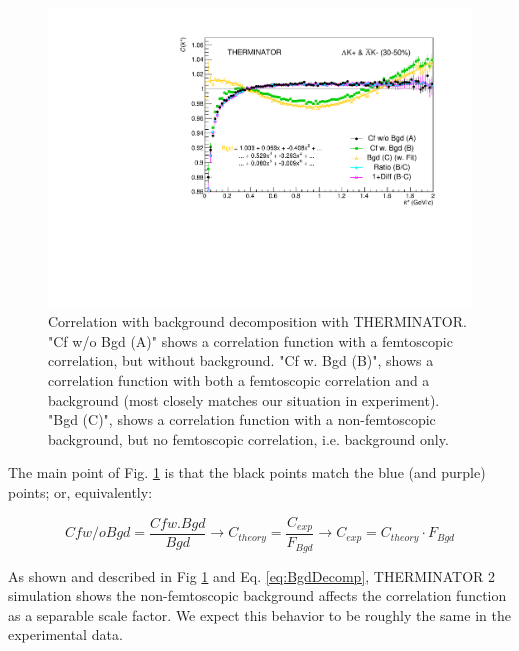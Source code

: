 \documentclass[../AnalysisNoteJBuxton.tex]{subfiles}
\begin{document}
\begin{figure}[h]
  \centering
  \includegraphics[width=\textwidth]{5_Fitting/Figures/CompareBgds_Full_LamKchPwConj_3050.pdf}
  \caption[Correlation with background decomposition (THERM)]{Correlation with background decomposition with THERMINATOR.  "Cf w/o Bgd (A)" shows a correlation function with a femtoscopic correlation, but without background.  "Cf w. Bgd (B)", shows a correlation function with both a femtoscopic correlation and a background (most closely matches our situation in experiment).  "Bgd (C)", shows a correlation function with a non-femtoscopic background, but no femtoscopic correlation, i.e. background only.}
  \label{fig:THERMCfBgdDecomposition}
\end{figure}


The main point of Fig. \ref{fig:THERMCfBgdDecomposition} is that the black points match the blue (and purple) points; or, equivalently:

\begin{equation}
  Cf w/o Bgd = \dfrac{Cf w. Bgd}{Bgd} \to C_{theory} = \dfrac{C_{exp}}{F_{Bgd}} \to C_{exp} = C_{theory}\cdot F_{Bgd}
  \label{eq:BgdDecomp}
\end{equation}

As shown and described in Fig \ref{fig:THERMCfBgdDecomposition} and Eq. \ref{eq:BgdDecomp}, THERMINATOR 2 simulation shows the non-femtoscopic background affects the correlation function as a separable scale factor.  We expect this behavior to be roughly the same in the experimental data.
\end{document}
